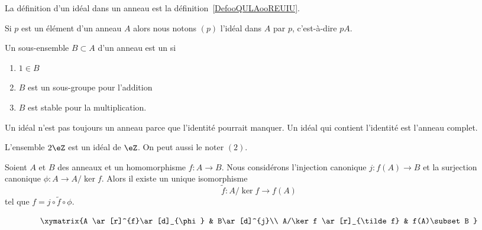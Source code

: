 La définition d'un idéal dans un anneau est la définition~\ref{DefooQULAooREUIU}.


\begin{definition}  \label{DefSKTooOTauAR}
    Si \( p\) est un élément d'un anneau \( A\) alors nous notons \( (p)\) l'idéal dans \( A\)  par \( p\), c'est-à-dire \( pA\).
\end{definition}

\begin{definition}  \label{DefAJVTPxb}
    Un sous-ensemble \( B\subset A\) d'un anneau est un  si
    \begin{enumerate}
        \item
            \( 1\in B\)
        \item
            \( B\) est un sous-groupe pour l'addition
        \item
            \( B\) est stable pour la multiplication.
    \end{enumerate}
\end{definition}

\begin{remark}
    Un idéal n'est pas toujours un anneau parce que l'identité pourrait manquer. Un idéal qui contient l'identité est l'anneau complet.
\end{remark}

\begin{example}
    L'ensemble \( 2\eZ\) est un idéal de \( \eZ\). On peut aussi le noter \( (2) \).
\end{example}

\begin{proposition}
    Soient \( A\) et \( B\) des anneaux et un homomorphisme \( f\colon A\to B\). Nous considérons l'injection canonique \( j\colon f(A)\to B\) et la surjection canonique \( \phi\colon A\to A/\ker f\). Alors il existe un unique isomorphisme
    \begin{equation}
        \tilde f \colon A/\ker f\to f(A)
    \end{equation}
    tel que \( f=j\circ\tilde f\circ\phi\).

    \begin{equation}
        \xymatrix{%
        A \ar[r]^{f}\ar[d]_{\phi}        &   B\ar[d]^{j}\\
           A/\ker f \ar[r]_{\tilde f}   &   f(A)\subset B
           }
    \end{equation}
\end{proposition}

